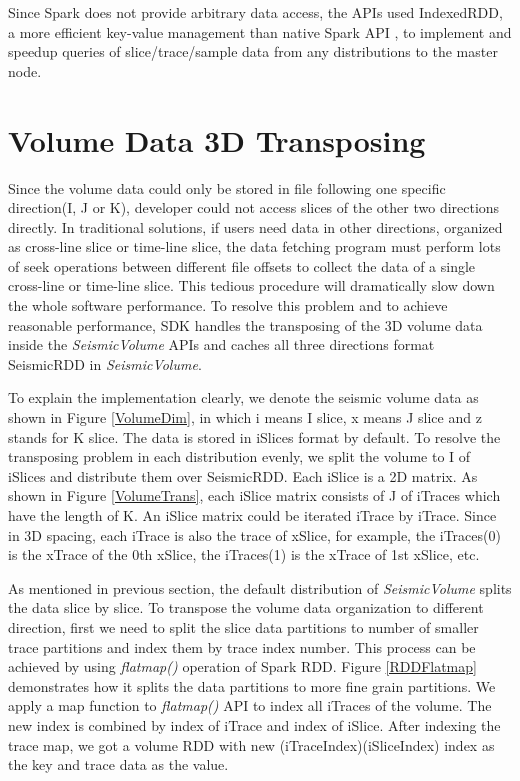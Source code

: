 Since Spark does not provide arbitrary data access, the APIs used IndexedRDD, a more efficient key-value management than native Spark API \cite{IndexedRDD}, to implement and speedup queries of slice/trace/sample data from any distributions to the master node.


\section{Volume Data 3D Transposing}

Since the volume data could only be stored in file following one specific direction(I, J or K), developer could not access slices of the other two directions directly. In traditional solutions, if users need data in other directions, organized as cross-line slice or time-line slice, the data fetching program must perform lots of seek operations between different file offsets to collect the data of a single cross-line or time-line slice. This tedious procedure will dramatically slow down the whole software performance. To resolve this problem and to achieve reasonable performance, SDK handles the transposing of the 3D volume data inside the \emph{SeismicVolume} APIs and caches all three directions format SeismicRDD in \emph{SeismicVolume}.

To explain the implementation clearly, we denote the seismic volume data as shown in Figure \ref{VolumeDim}, in which i means I slice, x means J slice and z stands for K slice. The data is stored in iSlices format by default. To resolve the transposing problem in each distribution evenly, we split the volume to I of iSlices and distribute them over SeismicRDD. Each iSlice is a 2D matrix. As shown in Figure \ref{VolumeTrans}, each iSlice matrix consists of J of iTraces which have the length of K. An iSlice matrix could be iterated iTrace by iTrace. Since in 3D spacing, each iTrace is also the trace of xSlice, for example, the iTraces(0) is the xTrace of the 0th xSlice, the iTraces(1) is the xTrace of 1st xSlice, etc. 

As mentioned in previous section, the default distribution of \emph{SeismicVolume} splits the data slice by slice. To transpose the volume data organization to different direction,  first we need to split the slice data partitions to number of smaller trace partitions and index them by trace index number. This process can be achieved by using \emph{flatmap()} operation of Spark RDD. Figure \ref{RDDFlatmap} demonstrates how it splits the data partitions to more fine grain partitions. We apply a map function to \emph{flatmap()} API to index all iTraces of the volume. The new index is combined by index of iTrace and index of iSlice. After indexing the trace map, we got a volume RDD with new (iTraceIndex)(iSliceIndex) index as the key and trace data as the value.

